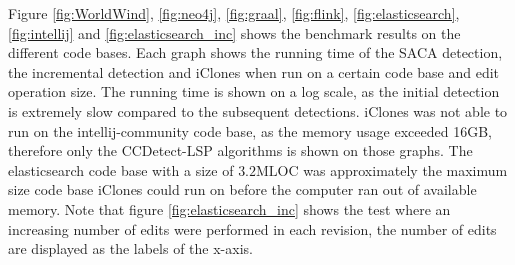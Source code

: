 Figure \ref{fig:WorldWind}, \ref{fig:neo4j}, \ref{fig:graal}, \ref{fig:flink},
\ref{fig:elasticsearch}, \ref{fig:intellij} and \ref{fig:elasticsearch_inc} shows the
benchmark results on the different code bases. Each graph shows the running time of the
SACA detection, the incremental detection and iClones when run on a certain code base and
edit operation size. The running time is shown on a log scale, as the initial detection is
extremely slow compared to the subsequent detections. iClones was not able to run on the
intellij-community code base, as the memory usage exceeded 16GB, therefore only the
CCDetect-LSP algorithms is shown on those graphs. The elasticsearch code base with a size
of $3.2\text{MLOC}$ was approximately the maximum size code base iClones could run on
before the computer ran out of available memory. Note that figure
\ref{fig:elasticsearch_inc} shows the test where an increasing number of edits were
performed in each revision, the number of edits are displayed as the labels of the x-axis.

\newpage
\null
\vfill

